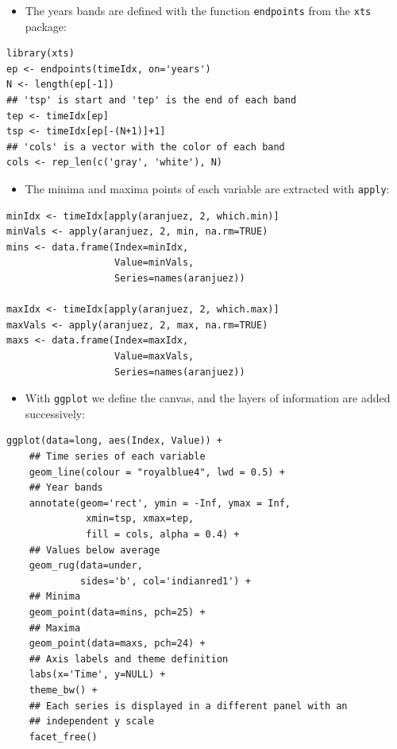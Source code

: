 \documentclass[smallroyalvopaper]{memoir}
\begin{document}
\begin{itemize}
\item The years bands are defined with the function \texttt{endpoints} from the
  \texttt{xts} package:
\end{itemize}
\lstset{language=R,numbers=none}
\begin{lstlisting}
library(xts)
ep <- endpoints(timeIdx, on='years')
N <- length(ep[-1])
## 'tsp' is start and 'tep' is the end of each band
tep <- timeIdx[ep]
tsp <- timeIdx[ep[-(N+1)]+1]
## 'cols' is a vector with the color of each band
cols <- rep_len(c('gray', 'white'), N)
\end{lstlisting}
\begin{itemize}
\item The minima and maxima points of each variable are extracted with
  \texttt{apply}:
\end{itemize}
\lstset{language=R,numbers=none}
\begin{lstlisting}
minIdx <- timeIdx[apply(aranjuez, 2, which.min)]
minVals <- apply(aranjuez, 2, min, na.rm=TRUE)
mins <- data.frame(Index=minIdx,
                   Value=minVals,
                   Series=names(aranjuez))

maxIdx <- timeIdx[apply(aranjuez, 2, which.max)]
maxVals <- apply(aranjuez, 2, max, na.rm=TRUE)
maxs <- data.frame(Index=maxIdx,
                   Value=maxVals,
                   Series=names(aranjuez))
\end{lstlisting}

\begin{itemize}
\item With \texttt{ggplot} we define the canvas, and the layers of information are
added successively:
\end{itemize}
\lstset{language=R,numbers=none}
\begin{lstlisting}
ggplot(data=long, aes(Index, Value)) +
    ## Time series of each variable
    geom_line(colour = "royalblue4", lwd = 0.5) +
    ## Year bands
    annotate(geom='rect', ymin = -Inf, ymax = Inf,
              xmin=tsp, xmax=tep,
              fill = cols, alpha = 0.4) +
    ## Values below average
    geom_rug(data=under,
             sides='b', col='indianred1') +
    ## Minima
    geom_point(data=mins, pch=25) +
    ## Maxima
    geom_point(data=maxs, pch=24) +
    ## Axis labels and theme definition
    labs(x='Time', y=NULL) +
    theme_bw() +
    ## Each series is displayed in a different panel with an
    ## independent y scale
    facet_free()
\end{lstlisting}
\end{document}
